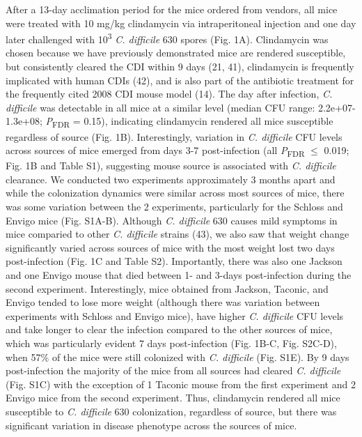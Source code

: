 \documentclass[11pt,]{article}
\begin{document}
After a 13-day acclimation period for the mice ordered from vendors, all
mice were treated with 10 mg/kg clindamycin via intraperitoneal
injection and one day later challenged with 10\textsuperscript{3}
\emph{C. difficile} 630 spores (Fig. 1A). Clindamycin was chosen because
we have previously demonstrated mice are rendered susceptible, but
consistently cleared the CDI within 9 days (21, 41), clindamycin is
frequently implicated with human CDIs (42), and is also part of the
antibiotic treatment for the frequently cited 2008 CDI mouse model (14).
The day after infection, \emph{C. difficile} was detectable in all mice
at a similar level (median CFU range: 2.2e+07-1.3e+08;
\emph{P}\textsubscript{FDR} = 0.15), indicating clindamycin rendered all
mice susceptible regardless of source (Fig. 1B). Interestingly,
variation in \emph{C. difficile} CFU levels across sources of mice
emerged from days 3-7 post-infection (all \emph{P}\textsubscript{FDR}
\(\le\) 0.019; Fig. 1B and Table S1), suggesting mouse source is
associated with \emph{C. difficile} clearance. We conducted two
experiments approximately 3 months apart and while the colonization
dynamics were similar across most sources of mice, there was some
variation between the 2 experiments, particularly for the Schloss and
Envigo mice (Fig. S1A-B). Although \emph{C. difficile} 630 causes mild
symptoms in mice comparied to other \emph{C. difficile} strains (43), we
also saw that weight change significantly varied across sources of mice
with the most weight lost two days post-infection (Fig. 1C and Table
S2). Importantly, there was also one Jackson and one Envigo mouse that
died between 1- and 3-days post-infection during the second experiment.
Interestingly, mice obtained from Jackson, Taconic, and Envigo tended to
lose more weight (although there was variation between experiments with
Schloss and Envigo mice), have higher \emph{C. difficile} CFU levels and
take longer to clear the infection compared to the other sources of
mice, which was particularly evident 7 days post-infection (Fig. 1B-C,
Fig. S2C-D), when 57\% of the mice were still colonized with \emph{C.
difficile} (Fig. S1E). By 9 days post-infection the majority of the mice
from all sources had cleared \emph{C. difficile} (Fig. S1C) with the
exception of 1 Taconic mouse from the first experiment and 2 Envigo mice
from the second experiment. Thus, clindamycin rendered all mice
susceptible to \emph{C. difficile} 630 colonization, regardless of
source, but there was significant variation in disease phenotype across
the sources of mice.
\end{document}
